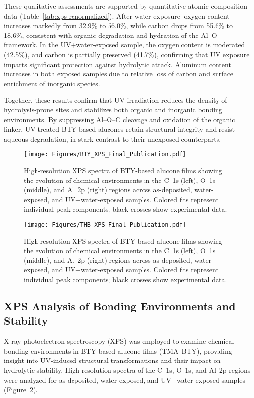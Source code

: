 These qualitative assessments are supported by quantitative atomic composition data (Table~\ref{tab:xps-renormalized}). After water exposure, oxygen content increases markedly from 32.9\% to 56.0\%, while carbon drops from 55.6\% to 18.6\%, consistent with organic degradation and hydration of the Al–O framework. In the UV+water-exposed sample, the oxygen content is moderated (42.5\%), and carbon is partially preserved (41.7\%), confirming that UV exposure imparts significant protection against hydrolytic attack. Aluminum content increases in both exposed samples due to relative loss of carbon and surface enrichment of inorganic species.

Together, these results confirm that UV irradiation reduces the density of hydrolysis-prone sites and stabilizes both organic and inorganic bonding environments. By suppressing Al–O–C cleavage and oxidation of the organic linker, UV-treated BTY-based alucones retain structural integrity and resist aqueous degradation, in stark contrast to their unexposed counterparts.


\begin{figure}[H]
  \centering
  \texttt{[image: Figures/BTY\_XPS\_Final\_Publication.pdf]}
  \caption{High-resolution XPS spectra of BTY-based alucone films showing the evolution of chemical environments in the C~1s (left), O~1s (middle), and Al~2p (right) regions across as-deposited, water-exposed, and UV+water-exposed samples. Colored fits represent individual peak components; black crosses show experimental data.}
  \label{fig:xps_spectra}
\end{figure}

\begin{figure}[H]
  \centering
  \texttt{[image: Figures/THB\_XPS\_Final\_Publication.pdf]}
  \caption{High-resolution XPS spectra of BTY-based alucone films showing the evolution of chemical environments in the C~1s (left), O~1s (middle), and Al~2p (right) regions across as-deposited, water-exposed, and UV+water-exposed samples. Colored fits represent individual peak components; black crosses show experimental data.}
  \label{fig:xps_spectra}
\end{figure}


\subsection{XPS Analysis of Bonding Environments and Stability}

X-ray photoelectron spectroscopy (XPS) was employed to examine chemical bonding environments in BTY-based alucone films (TMA–BTY), providing insight into UV-induced structural transformations and their impact on hydrolytic stability. High-resolution spectra of the C~1s, O~1s, and Al~2p regions were analyzed for as-deposited, water-exposed, and UV+water-exposed samples (Figure~\ref{fig:xps_spectra}).

